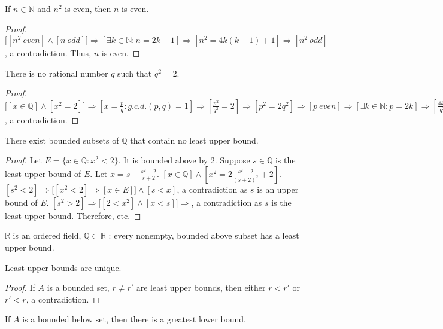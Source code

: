 \documentclass[crop=false,class=article,oneside]{standalone}
\begin{document}
    \begin{lemma}
    If $n\in \mathbb{N}$ and $n^2$ is even, then $n$ is even.
    \end{lemma}
    \begin{proof}
    $\big[[n^2\ even]\land [n\ odd]\big]\Rightarrow [\exists k\in \mathbb{N}:n=2k-1]\Rightarrow [n^2 = 4k(k-1)+1]\Rightarrow [n^2\ odd]$, a contradiction. Thus, $n$ is even.
    \end{proof}
    \begin{theorem}
    There is no rational number $q$ such that $q^2 = 2$.
    \end{theorem}
    \begin{proof}
    $\big[[x\in \mathbb{Q}]\land [x^2=2]\big]\Rightarrow [x= \frac{p}{q}:g.c.d.(p,q)=1]\Rightarrow [\frac{p^2}{q^2}= 2]\Rightarrow [p^2 = 2q^2]\Rightarrow [p\ even]\Rightarrow [\exists k\in \mathbb{N}:p=2k]\Rightarrow [\frac{4k^2}{q^2}=2]\Rightarrow [q^2 = 2k^2]\Rightarrow [q\ even]\Rightarrow [g.c.d.(p,q)\geq 2]$, a contradiction.
    \end{proof}
    \begin{theorem}
    There exist bounded subsets of $\mathbb{Q}$ that contain no least upper bound.
    \end{theorem}
    \begin{proof}
    Let $E=\{x\in \mathbb{Q}:x^2 < 2\}$. It is bounded above by $2$. Suppose $s\in \mathbb{Q}$ is the least upper bound of $E$. Let $x = s - \frac{s^2-2}{s+2}$. $[x\in \mathbb{Q}] \land [x^2 = 2\frac{s^2-2}{(s+2)^2}+2]$. $[s^2<2]\Rightarrow \big[[x^2<2 ]\Rightarrow [x\in E]\big]\land [s<x]$, a contradiction as $s$ is an upper bound of $E$. $[s^2>2]\Rightarrow \big[[2<x^2 ]\land [x<s]\big]\Rightarrow$, a contradiction as $s$ is the least upper bound. Therefore, etc.
    \end{proof}
    \begin{definition}
    $\mathbb{R}$ is an ordered field, $\mathbb{Q}\subset \mathbb{R}$ : every nonempty, bounded above subset has a least upper bound.
    \end{definition}
    \begin{theorem}
    Least upper bounds are unique.
    \end{theorem}
    \begin{proof}
    If $A$ is a bounded set, $r\ne r'$ are least upper bounds, then either $r<r'$ or $r'<r$, a contradiction.
    \end{proof}
    \begin{theorem}
    If $A$ is a bounded below set, then there is a greatest lower bound.
    \end{theorem}
\end{document}
